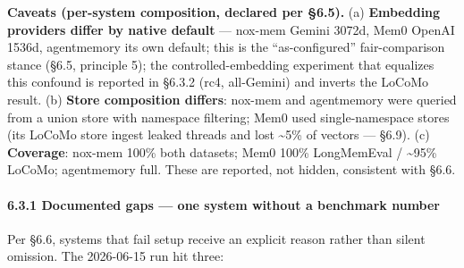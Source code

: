 \documentclass[
]{article}
\begin{document}
\textbf{Caveats (per-system composition, declared per §6.5).} (a)
\textbf{Embedding providers differ by native default} --- nox-mem Gemini
3072d, Mem0 OpenAI 1536d, agentmemory its own default; this is the
``as-configured'' fair-comparison stance (§6.5, principle 5); the
controlled-embedding experiment that equalizes this confound is reported
in §6.3.2 (rc4, all-Gemini) and inverts the LoCoMo result. (b)
\textbf{Store composition differs}: nox-mem and agentmemory were queried
from a union store with namespace filtering; Mem0 used single-namespace
stores (its LoCoMo store ingest leaked threads and lost
\textasciitilde5\% of vectors --- §6.9). (c) \textbf{Coverage}: nox-mem
100\% both datasets; Mem0 100\% LongMemEval / \textasciitilde95\%
LoCoMo; agentmemory full. These are reported, not hidden, consistent
with §6.6.

\paragraph{6.3.1 Documented gaps --- one system without a benchmark
number}\label{documented-gaps-one-system-without-a-benchmark-number}

Per §6.6, systems that fail setup receive an explicit reason rather than
silent omission. The 2026-06-15 run hit three:
\end{document}
